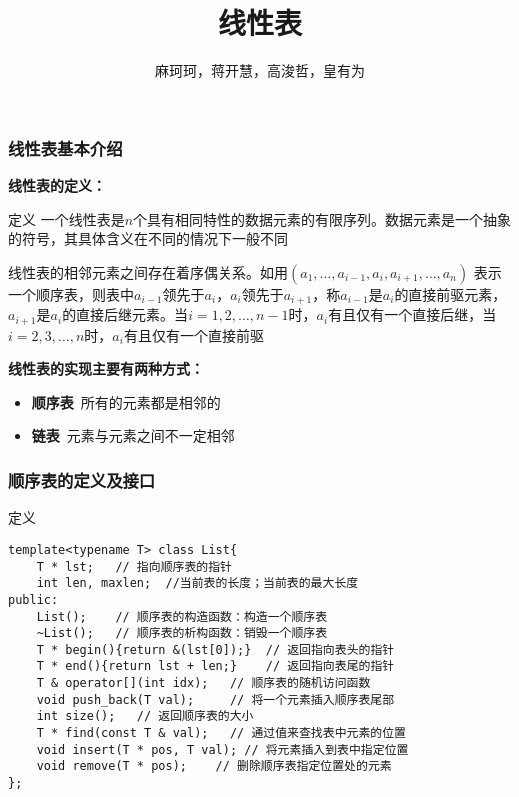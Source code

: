 \documentclass{beamer}
\author{麻珂珂，蒋开慧，高浚哲，皇有为}
\institute{XUPT}
\title{线性表}
\begin{document}
	
	\frame{\titlepage}
	
	\begin{frame}[c]\frametitle{线性表基本介绍}
		\textbf{线性表的定义：}
		\begin{block}{定义}
			一个线性表是$n$个具有相同特性的数据元素的有限序列。数据元素是一个抽象的符号，其具体含义在不同的情况下一般不同 \par
			线性表的相邻元素之间存在着序偶关系。如用$(a_1,\dots, a_{i - 1}, a_i, a_{i + 1},\dots,a_n)$ 表示一个顺序表，则表中$a_{i - 1}$领先于$a_i$，$a_i$领先于$a_{i+1}$，称$a_{i-1}$是$a_i$的直接前驱元素，$a_{i+1}$是$a_i$的直接后继元素。当$i=1,2,\dots,n-1$时，$a_i$有且仅有一个直接后继，当$i=2,3,\dots,n$时，$a_i$有且仅有一个直接前驱
		\end{block}
		\textbf{线性表的实现主要有两种方式：}
		\begin{itemize}
			\item \textbf{顺序表}\ 所有的元素都是相邻的
			\item \textbf{链表}\ 元素与元素之间不一定相邻
		\end{itemize}
	\end{frame}
	
	\begin{frame}[fragile]\frametitle{顺序表的定义及接口}
		\begin{block}{定义}
\begin{verbatim}
template<typename T> class List{
    T * lst;   // 指向顺序表的指针
    int len, maxlen;  //当前表的长度；当前表的最大长度
public:
    List();    // 顺序表的构造函数：构造一个顺序表
    ~List();   // 顺序表的析构函数：销毁一个顺序表
    T * begin(){return &(lst[0]);}  // 返回指向表头的指针
    T * end(){return lst + len;}    // 返回指向表尾的指针
    T & operator[](int idx);   // 顺序表的随机访问函数
    void push_back(T val);     // 将一个元素插入顺序表尾部
    int size();   // 返回顺序表的大小
    T * find(const T & val);   // 通过值来查找表中元素的位置
    void insert(T * pos, T val); // 将元素插入到表中指定位置
    void remove(T * pos);    // 删除顺序表指定位置处的元素
};
\end{verbatim}
		\end{block}
	\end{frame}
\end{document}

